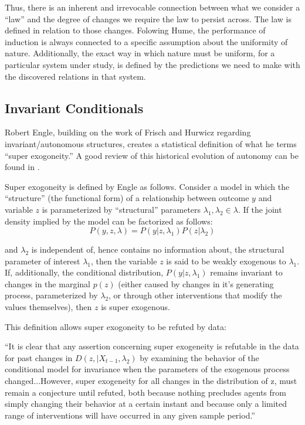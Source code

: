 \documentclass[a4paper,12pt]{article}
\begin{document}
Thus, there is an inherent and irrevocable connection between what we consider a ``law'' and the degree of changes we require the law to persist across. The law is defined in relation to those changes. Folowing Hume, the performance of induction is always connected to a specific assumption about the uniformity of nature. Additionally, the exact way in which nature must be uniform, for a particular system under study, is defined by the predictions we need to make with the discovered relations in that system.


\subsection{Invariant Conditionals}

Robert Engle, building on the work of Frisch and Hurwicz regarding invariant/autonomous structures, creates a statistical definition of what he terms ``super exogoneity.'' A good review of this historical evolution of autonomy can be found in \cite{Aldrich1989}.

Super exogoneity is defined by Engle as follows. Consider a model in which the ``structure'' (the functional form) of a relationship between outcome $y$ and variable $z$ is parameterized by ``structural'' parameters $\lambda_1, \lambda_2 \in \lambda$. If the joint density implied by the model can be factorized as follows:
%
$$
P(y, z, \lambda) = P(y | z, \lambda_1)P(z | \lambda_2)
$$

and $\lambda_2$ is independent of, hence contains no information about, the structural parameter of interest $\lambda_1$, then the variable $z$ is said to be weakly exogenous to $\lambda_1$. If, additionally, the conditional distribution, $P(y | z, \lambda_1)$ remains invariant to changes in the marginal $p(z)$ (either caused by changes in it's generating process, parameterized by $\lambda_2$, or through other interventions that modify the values themselves), then $z$ is super exogenous. 

This definition allows super exogoneity to be refuted by data:

\begin{displayquote}
``It is clear that any assertion concerning super exogeneity is refutable in the data for past changes in $D(z, | X_{t-1}, \lambda_2)$ by examining the behavior of the conditional model for invariance when the parameters of the exogenous process changed...However, super exogeneity for all changes in the distribution of z, must remain a conjecture until refuted, both because nothing precludes agents from simply changing their behavior at a certain instant and because only a limited range of interventions will have occurred in any given sample period.''
\end{displayquote}
\end{document}
